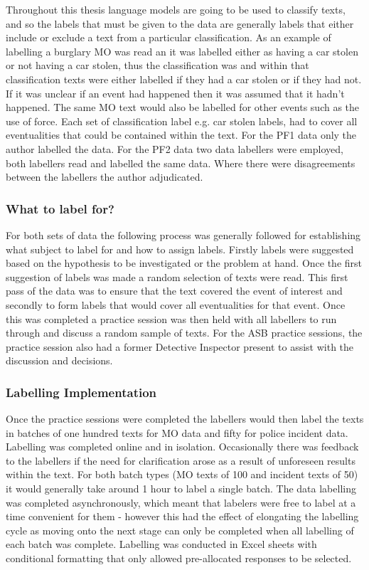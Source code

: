 Throughout this thesis language models are going to be used to classify texts, and so the labels that must be given to the data are generally labels that either include or exclude a text from a particular classification. As an example of labelling a burglary MO was read an it was labelled either as having a car stolen or not having a car stolen, thus the classification was  and within that classification texts were either labelled  if they had a car stolen or  if they had not. If it was unclear if an event had happened then it was assumed that it hadn't happened.  The same MO text would also be labelled for other events such as the use of force. Each set of classification label e.g. car stolen labels, had to cover all eventualities that could be contained within the text. For the PF1 data only the author labelled the data. For the PF2 data two data labellers were employed, both labellers read and labelled the same data. Where there were disagreements between the labellers the author adjudicated.

\subsubsection{What to label for?}

For both sets of data the following process was generally followed for establishing what subject to label for and how to assign labels. Firstly labels were suggested based on the hypothesis to be investigated or the problem at hand. Once the first suggestion of labels was made a random selection of texts were read. This first pass of the data was to ensure that the text covered the event of interest and secondly to form labels that would cover all eventualities for that event. Once this was completed a practice session was then held with all labellers to run through and discuss a random sample of texts. For the ASB practice sessions, the practice session also had a former Detective Inspector present to assist with the discussion and decisions.

\subsubsection{Labelling Implementation}

Once the practice sessions were completed the labellers would then label the texts in batches of one hundred texts for MO data and fifty for police incident data. Labelling was completed online and in isolation. Occasionally there was feedback to the labellers if the need for clarification arose as a result of unforeseen results within the text. For both batch types (MO texts of 100 and incident texts of 50) it would generally take around 1 hour to label a single batch. The data labelling was completed asynchronously, which meant that labelers were free to label at a time convenient for them - however this had the effect of elongating the labelling cycle as moving onto the next stage can only be completed when all labelling of each batch was complete. Labelling was conducted in Excel sheets with conditional formatting that only allowed pre-allocated responses to be selected.


